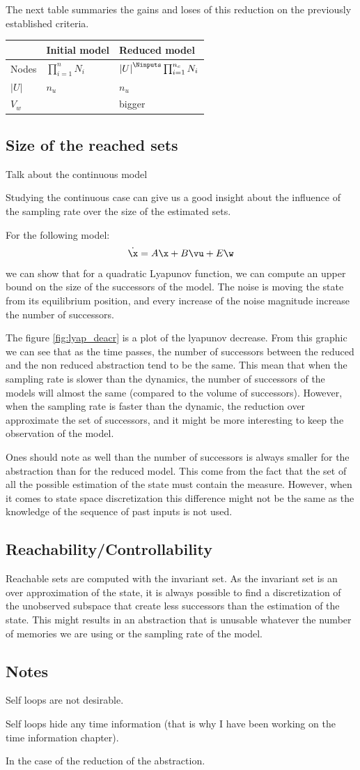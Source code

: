 The next table summaries the gains and loses of this reduction on the previously established criteria.

\begin{tabular}{ l|ll }
& Initial model & Reduced model\\ \hline
Nodes & $\prod_{i=1}^n N_i$ & $\left | U \right |^{\Ninputs} \prod_{i=1}^{n_c} N_i $\\ 
$|U|$ & $n_u$ & $n_u$\\
$V_w$ &  & bigger \\
\end{tabular}

\subsection{Size of the reached sets}
Talk about the continuous model

Studying the continuous case can give us a good insight about the influence of the sampling rate over the size of the estimated sets.

For the following model:
\begin{equation}
\dot{\x} = A \x + B \vu + E \w
\end{equation}
we can show that for a quadratic Lyapunov function, we can compute an upper bound on the size of the successors of the model.
The noise is moving the state from its equilibrium position, and every increase of the noise magnitude increase the number of successors.

The figure \ref{fig:lyap_deacr} is a plot of the lyapunov decrease.
From this graphic we can see that as the time passes, the number of successors between the reduced and the non reduced abstraction tend to be the same. This mean that when the sampling rate is slower than the dynamics, the number of successors of the models will almost the same (compared to the volume of successors).
However, when the sampling rate is faster than the dynamic, the reduction over approximate the set of successors, and it might be more interesting to keep the observation of the model.

Ones should note as well than the number of successors is always smaller for the abstraction than for the reduced model. This come from the fact that the set of all the possible estimation of the state must contain the measure.
However, when it comes to state space discretization this difference might not be the same as the knowledge of the sequence of past inputs is not used. 

\subsection{Reachability/Controllability}
Reachable sets are computed with the invariant set. As the invariant set is an over approximation of the state, it is always possible to find a discretization of the unobserved subspace that create less successors than the estimation of the state.
This might results in an abstraction that is unusable whatever the number of memories we are using or the sampling rate of the model.

\subsection{Notes}
Self loops are not desirable.

Self loops hide any time information (that is why I have been working on the time information chapter).

In the case of the reduction of the abstraction.